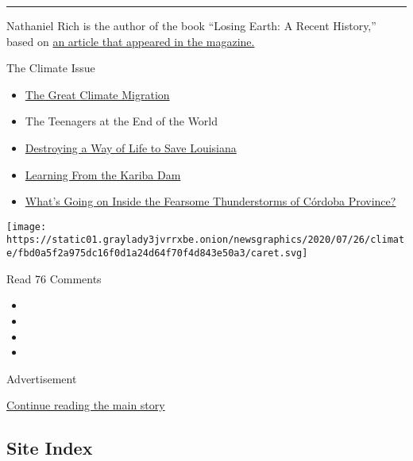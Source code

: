 \begin{center}\rule{0.5\linewidth}{\linethickness}\end{center}

Nathaniel Rich is the author of the book ``Losing Earth: A Recent
History,'' based on
\href{https://www.nytimes3xbfgragh.onion/interactive/2018/08/01/magazine/climate-change-losing-earth.html}{an
article that appeared in the magazine.}

The Climate Issue

\begin{itemize}
\tightlist
\item
  \href{https://www.nytimes3xbfgragh.onion/interactive/2020/07/23/magazine/climate-migration.html}{The
  Great Climate Migration}
\item
  The Teenagers at the End of the World
\item
  \href{https://www.nytimes3xbfgragh.onion/interactive/2020/07/21/magazine/louisiana-coast-engineering.html}{Destroying
  a Way of Life to Save Louisiana}
\item
  \href{https://www.nytimes3xbfgragh.onion/interactive/2020/07/22/magazine/zambia-kariba-dam.html}{Learning
  From the Kariba Dam}
\item
  \href{https://www.nytimes3xbfgragh.onion/interactive/2020/07/22/magazine/worst-storms-argentina.html}{What's
  Going on Inside the Fearsome Thunderstorms of Córdoba Province?}
\end{itemize}

\protect\hyperlink{}{} \protect\hyperlink{}{}

\texttt{[image: https://static01.graylady3jvrrxbe.onion/newsgraphics/2020/07/26/climate/fbd0a5f2a975dc16f0d1a24d64f70f4d843e50a3/caret.svg]}

Read 76 Comments

\begin{itemize}
\item
\item
\item
\item
\end{itemize}

Advertisement

\protect\hyperlink{after-bottom}{Continue reading the main story}

\hypertarget{site-index}{%
\subsection{Site Index}\label{site-index}}

